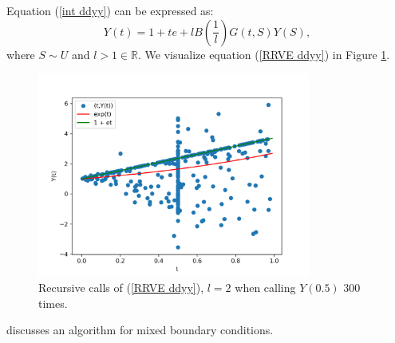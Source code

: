 \documentclass[a4paper,12pt]{article}
\begin{document}
\begin{example}[$y''=y$ mixed boundary conditions]
    Equation (\ref{int ddyy}) can be expressed as:
    \begin{equation} \label{RRVE ddyy}
        Y(t) = 1 + te + l B\left(\frac{1}{l}\right)G(t,S)Y(S),
    \end{equation}
    where $S \sim U$ and $l>1 \in \mathbb{R}$. We visualize
    equation (\ref{RRVE ddyy}) in Figure \ref{fig:ddyy}.

    \begin{figure}[h!]
        \centering
        \includegraphics[width=0.8\textwidth]{plots/ddyy.png}
        \caption{Recursive calls of (\ref{RRVE ddyy}), $l=2$ when
            calling $Y(0.5)$ $300$ times.}
        \label{fig:ddyy}
    \end{figure}

\end{example}

\begin{related}[$y''=y$ mixed boundary conditions]
    \cite{sawhney_walk_2023} discusses an algorithm for mixed boundary conditions.
\end{related}


%
%
%
\end{document}
